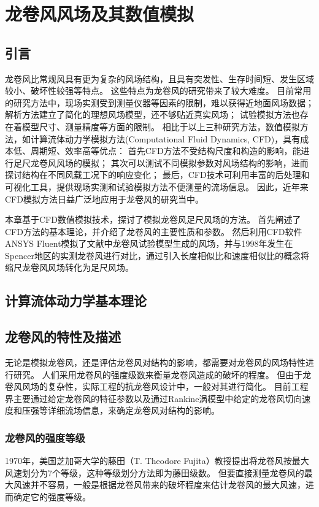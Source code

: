 \graphicspath{{figures/tornado/}}
\chapter{龙卷风风场及其数值模拟}\label{chapter:tornado}

\section{引言}
龙卷风比常规风具有更为复杂的风场结构，且具有突发性、生存时间短、发生区域较小、破坏性较强等特点。
这些特点为龙卷风的研究带来了较大难度。
目前常用的研究方法中，现场实测受到测量仪器等因素的限制，难以获得近地面风场数据；
解析方法建立了简化的理想风场模型，还不够贴近真实风场；
试验模拟方法也存在着模型尺寸、测量精度等方面的限制。
相比于以上三种研究方法，数值模拟方法，如计算流体动力学模拟方法(Computational Fluid Dynamics, CFD)，具有成本低、周期短、效率高等优点：
首先CFD方法不受结构尺度和构造的影响，能进行足尺龙卷风风场的模拟；
其次可以测试不同模拟参数对风场结构的影响，进而探讨结构在不同风载工况下的响应变化；
最后，CFD技术可利用丰富的后处理和可视化工具，提供现场实测和试验模拟方法不便测量的流场信息。
因此，近年来CFD模拟方法日益广泛地应用于龙卷风的研究当中。

本章基于CFD数值模拟技术，探讨了模拟龙卷风足尺风场的方法。
首先阐述了CFD方法的基本理论，并介绍了龙卷风的主要性质和参数。
然后利用CFD软件ANSYS Fluent模拟了文献中龙卷风试验模型生成的风场，并与1998年发生在Spencer地区的实测龙卷风进行对比，通过引入长度相似比和速度相似比的概念将缩尺龙卷风风场转化为足尺风场。

\section{计算流体动力学基本理论}


\section{龙卷风的特性及描述}
无论是模拟龙卷风，还是评估龙卷风对结构的影响，都需要对龙卷风的风场特性进行研究。
人们采用龙卷风的强度级数来衡量龙卷风造成的破坏的程度。
但由于龙卷风风场的复杂性，实际工程的抗龙卷风设计中，一般对其进行简化。
目前工程界主要通过给定龙卷风的特征参数以及通过Rankine涡模型中给定的龙卷风切向速度和压强等详细流场信息，来确定龙卷风对结构的影响。

\subsection{龙卷风的强度等级}
1970年，美国芝加哥大学的藤田（T. Theodore Fujita）教授提出将龙卷风按最大风速划分为7个等级，这种等级划分方法即为藤田级数。
但要直接测量龙卷风的最大风速并不容易，一般是根据龙卷风带来的破坏程度来估计龙卷风的最大风速，进而确定它的强度等级。

